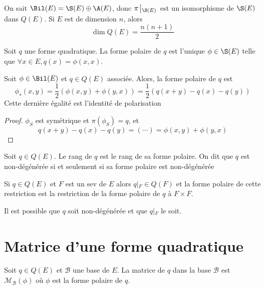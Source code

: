 \begin{cor}
On sait $\Bil(E)=\S(E)\oplus \A(E)$, donc $\pi\left|_{\S(E)}\right.$ est un isomorphisme de $\S(E)$ dans $Q(E)$. Si $E$ est de dimension $n$, alors \[\dim Q(E)= \frac{n(n+1)}{2}\]
\end{cor}

\begin{dfn}
    Soit $q$ une forme quadratique. La forme polaire de $q$ est l'unique $\phi \in  \S(E)$ telle que $\forall  x \in  E, q(x)=\phi(x,x)$.
\end{dfn}

\begin{prop}
    Soit $\phi \in  \Bil(E)$ et $q \in  Q(E)$ associée. Alors, la forme polaire de $q$ est \[\phi_s(x, y)=\frac12(\phi(x, y)+\phi(y, x))=\frac12(q(x+y)-q(x)-q(y))\]
    Cette dernière égalité est l'identité de polarisation
\end{prop}

\begin{proof}
    $\phi_S$ est symétrique et $\pi(\phi_S)=q$, et \[q(x+y)-q(x)-q(y)= (\cdots )=\phi(x,y)+\phi(y,x)\]
\end{proof}

\begin{dfn}
    Soit $q \in  Q(E)$. Le rang de $q$ est le rang de sa forme polaire. On dit que $q$ est non-dégénérée si et seulement si sa forme polaire est non-dégénérée
\end{dfn}

\begin{prop}
Si $q \in  Q(E)$ et $F$ est un sev de $E$ alors $q\left|_F\right. \in  Q(F)$ et la forme polaire de cette restriction est la restriction de la forme polaire de $q$ à $F\times F$.
\end{prop}

\begin{rem}
Il est possible que $q$ soit non-dégénérée et que $q\left|_{F}\right.$ le soit.
\end{rem}

\section{Matrice d'une forme quadratique}

\begin{dfn}
    Soit $q \in  Q(E)$ et $\mathcal  B$ une base de $E$. La matrice de  $q$ dans la base  $\mathcal  B$ est $\mathcal  M_{\mathcal  B}(\phi)$ où $\phi$ est la forme polaire de  $q$.
\end{dfn}

